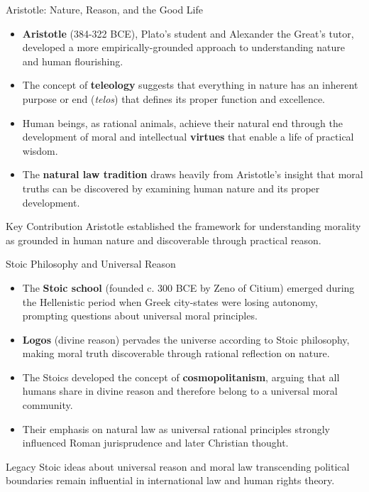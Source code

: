\documentclass{beamer}
\begin{document}
\begin{frame}{Aristotle: Nature, Reason, and the Good Life}
    \begin{itemize}
        \item \textbf{Aristotle} (384-322 BCE), Plato's student and Alexander the Great's tutor, developed a more empirically-grounded approach to understanding nature and human flourishing.
        
        \item The concept of \textbf{teleology} suggests that everything in nature has an inherent purpose or end (\textit{telos}) that defines its proper function and excellence.
        
        \item Human beings, as rational animals, achieve their natural end through the development of moral and intellectual \textbf{virtues} that enable a life of practical wisdom.
        
        \item The \textbf{natural law tradition} draws heavily from Aristotle's insight that moral truths can be discovered by examining human nature and its proper development.
    \end{itemize}
    
    \begin{alertblock}{Key Contribution}
        Aristotle established the framework for understanding morality as grounded in human nature and discoverable through practical reason.
    \end{alertblock}
\end{frame}

\begin{frame}{Stoic Philosophy and Universal Reason}
    \begin{itemize}
        \item The \textbf{Stoic school} (founded c. 300 BCE by Zeno of Citium) emerged during the Hellenistic period when Greek city-states were losing autonomy, prompting questions about universal moral principles.
        
        \item \textbf{Logos} (divine reason) pervades the universe according to Stoic philosophy, making moral truth discoverable through rational reflection on nature.
        
        \item The Stoics developed the concept of \textbf{cosmopolitanism}, arguing that all humans share in divine reason and therefore belong to a universal moral community.
        
        \item Their emphasis on natural law as universal rational principles strongly influenced Roman jurisprudence and later Christian thought.
    \end{itemize}
    
    \begin{alertblock}{Legacy}
        Stoic ideas about universal reason and moral law transcending political boundaries remain influential in international law and human rights theory.
    \end{alertblock}
\end{frame}
\end{document}
